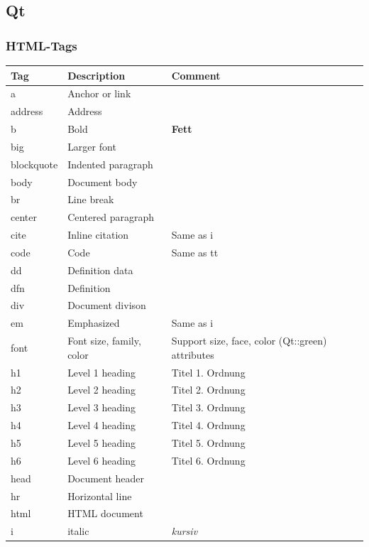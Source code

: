 \subsection{Qt}
\subsubsection{HTML-Tags}

\begin{longtable}{| p{} | p{} | p{}|}
	\hline \textbf{Tag} & \textbf{Description} & \textbf{Comment}\\
	\hline a& Anchor or link& \\
	\hline address & Address &\\
	\hline b& Bold & \textbf{Fett}\\
	\hline big & Larger font&\\
	\hline blockquote & Indented paragraph&\\
	\hline body & Document body &\\
	\hline br & Line break &\\
	\hline center & Centered paragraph&\\
	\hline cite & Inline citation & Same as i\\
	\hline code & Code& Same as tt\\
	\hline dd & Definition data & \\
	\hline dfn & Definition & \\
	\hline div& Document divison&\\
	\hline em& Emphasized& Same as i\\
	\hline font& Font size, family, color& Support size, face, color (Qt::green) attributes\\
	\hline h1 & Level 1 heading& Titel 1. Ordnung\\
	\hline h2 & Level 2 heading& Titel 2. Ordnung\\
	\hline h3 & Level 3 heading& Titel 3. Ordnung\\
	\hline h4 & Level 4 heading& Titel 4. Ordnung\\
	\hline h5 & Level 5 heading& Titel 5. Ordnung\\
	\hline h6 & Level 6 heading& Titel 6. Ordnung\\
	\hline head & Document header&\\
	\hline hr & Horizontal line&\\
	\hline html & HTML document&\\
	\hline i & italic& \textit{kursiv}\\

\end{longtable}
